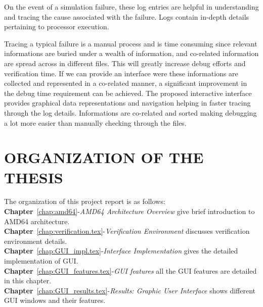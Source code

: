 On the event of a simulation failure, these log entries are helpful in understanding and tracing the cause associated with the failure. Logs contain in-depth details pertaining to processor execution. 

Tracing a typical failure is a manual process and is time consuming since relevant informations are buried under a wealth of information, and co-related information are spread across in different files. This will greatly increase debug efforts and verification time. If we can provide an interface were these informations are collected and represented in a co-related manner, a significant improvement in the debug time requirement can be achieved. The proposed interactive interface provides graphical data representations and navigation helping in faster tracing through the log details. Informations are co-related and sorted making debugging a lot more easier than manually checking through the files.

 


\section{ORGANIZATION OF THE THESIS}
The organization of this project report is as follows:\\
\noindent 
{\bf Chapter}~\ref{chap:amd64}-{\it AMD64 Architecture Overview} give brief introduction to AMD64 architecture.\\
{\bf Chapter}~\ref{chap:verification.tex}-{\it Verification Environment} discusses verification environment details.\\
{\bf Chapter}~\ref{chap:GUI_impl.tex}-{\it Interface Implementation} gives the detailed implementation of GUI.\\
{\bf Chapter}~\ref{chap:GUI_features.tex}-{\it GUI features} all the GUI features are detailed in this chapter.\\
{\bf Chapter}~\ref{chap:GUI_results.tex}-{\it Results: Graphic User Interface} shows different GUI windows and their features.\\

